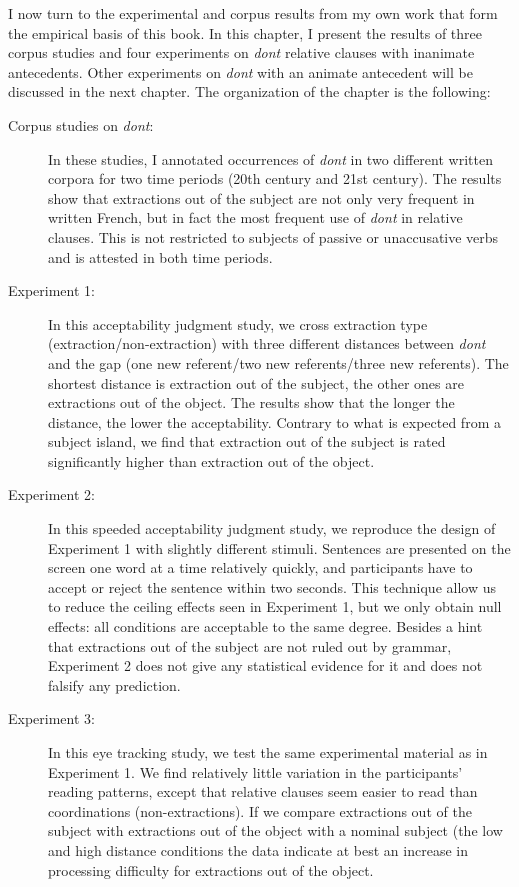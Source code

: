\label{ch:exp-dont}

I now turn to the experimental and corpus results from my own work that form the empirical basis of this book. In this chapter, I present the results of three corpus studies and four experiments on \emph{dont} relative clauses with inanimate antecedents. Other experiments on \emph{dont} with an animate antecedent will be discussed in the next chapter. The organization of the chapter is the following:

\begin{description}
\item[Corpus studies on \emph{dont}:] In these studies, I annotated occurrences of \emph{dont} in two different written corpora for two time periods (20th century and 21st century). The results show that extractions out of the subject are not only very frequent in written French, but in fact the most frequent use of \emph{dont} in relative clauses. This is not restricted to subjects of passive or unaccusative verbs and is attested in both time periods.

\item[Experiment 1:] In this acceptability judgment study, we cross extraction type (extraction\slash non-extraction) with three different distances between \emph{dont} and the gap (one new referent\slash two new referents\slash three new referents). The shortest distance is extraction out of the subject, the other ones are extractions out of the object. The results show that the longer the distance, the lower the acceptability. Contrary to what is expected from a subject island, we find that extraction out of the subject is rated significantly higher than extraction out of the object.

\item[Experiment 2:] In this speeded acceptability judgment study, we reproduce the design of Experiment 1 with slightly different stimuli. Sentences are presented on the screen one word at a time relatively quickly, and participants have to accept or reject the sentence within two seconds. This technique allow us to reduce the ceiling effects seen in Experiment 1, but we only obtain null effects: all conditions are acceptable to the same degree. Besides a hint that extractions out of the subject are not ruled out by grammar, Experiment 2 does not give any statistical evidence for it and does not falsify any prediction.

\item[Experiment 3:] In this eye tracking study, we test the same experimental material as in Experiment 1. We find relatively little variation in the participants' reading patterns, except that relative clauses seem easier to read than coordinations (non-extractions). If we compare extractions out of the subject with extractions out of the object with a nominal subject (the low and high distance conditions the data indicate at best an increase in processing difficulty for extractions out of the object.


\end{description}
